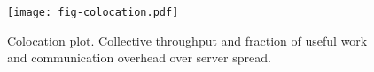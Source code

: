 \begin{figure}[H]
\texttt{[image: fig-colocation.pdf]}
\caption{Colocation plot. Collective throughput and fraction of useful work and communication overhead 
over server spread.}
\label{fig:colocation}
\end{figure}
